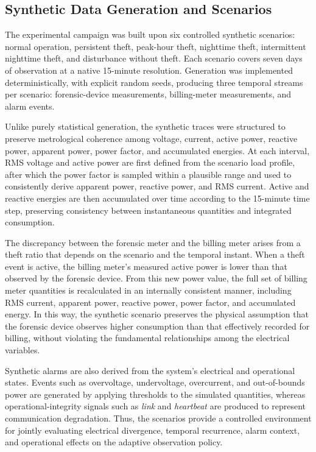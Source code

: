\documentclass[journal]{IEEEtran}
\begin{document}
\subsection{Synthetic Data Generation and Scenarios}
The experimental campaign was built upon six controlled synthetic scenarios: normal operation, persistent theft, peak-hour theft, nighttime theft, intermittent nighttime theft, and disturbance without theft. Each scenario covers seven days of observation at a native 15-minute resolution. Generation was implemented deterministically, with explicit random seeds, producing three temporal streams per scenario: forensic-device measurements, billing-meter measurements, and alarm events.

Unlike purely statistical generation, the synthetic traces were structured to preserve metrological coherence among voltage, current, active power, reactive power, apparent power, power factor, and accumulated energies. At each interval, RMS voltage and active power are first defined from the scenario load profile, after which the power factor is sampled within a plausible range and used to consistently derive apparent power, reactive power, and RMS current. Active and reactive energies are then accumulated over time according to the 15-minute time step, preserving consistency between instantaneous quantities and integrated consumption.

The discrepancy between the forensic meter and the billing meter arises from a theft ratio that depends on the scenario and the temporal instant. When a theft event is active, the billing meter's measured active power is lower than that observed by the forensic device. From this new power value, the full set of billing meter quantities is recalculated in an internally consistent manner, including RMS current, apparent power, reactive power, power factor, and accumulated energy. In this way, the synthetic scenario preserves the physical assumption that the forensic device observes higher consumption than that effectively recorded for billing, without violating the fundamental relationships among the electrical variables.

Synthetic alarms are also derived from the system's electrical and operational states. Events such as overvoltage, undervoltage, overcurrent, and out-of-bounds power are generated by applying thresholds to the simulated quantities, whereas operational-integrity signals such as \textit{link} and \textit{heartbeat} are produced to represent communication degradation. Thus, the scenarios provide a controlled environment for jointly evaluating electrical divergence, temporal recurrence, alarm context, and operational effects on the adaptive observation policy.
\end{document}
